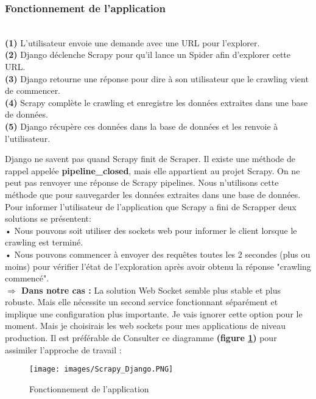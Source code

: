 \subsubsection{Fonctionnement de l'application}\\
\noindent\textbf{(1)} L'utilisateur envoie une demande avec une URL pour l'explorer. \\
\textbf{(2)} Django déclenche Scrapy pour qu'il lance un Spider afin d'explorer cette URL. \\
\textbf{(3)} Django retourne une réponse pour dire à son utilisateur que le crawling vient de commencer.\\ 
\textbf{(4)} Scrapy complète le crawling et enregistre les données extraites dans une base de données. \\
\textbf{(5)} Django récupère ces données dans la base de données et les renvoie à l'utilisateur. 
\vspace{0.5cm}

Django ne savent pas quand Scrapy finit de Scraper. Il existe une méthode de rappel appelée \textbf{pipeline\_closed}, mais elle appartient au projet Scrapy. On ne peut pas renvoyer une réponse de Scrapy pipelines. Nous n'utilisons cette méthode que pour sauvegarder les données extraites dans une base de données.\\
Pour informer l'utilisateur de l'application que Scrapy a fini de Scrapper deux solutions se présentent:\\
\indent• Nous pouvons soit utiliser des sockets web pour informer le client lorsque le crawling est terminé.\\
\indent• Nous pouvons commencer à envoyer des requêtes toutes les 2 secondes (plus ou moins) pour vérifier l'état de l'exploration après avoir obtenu la réponse "crawling commencé".\\

\textbf{$\Rightarrow$ Dans notre cas :} La solution Web Socket semble plus stable et plus robuste. Mais elle nécessite un second service fonctionnant séparément et implique une configuration plus importante. Je vais ignorer cette option pour le moment. Mais je choisirais les web sockets pour mes applications de niveau production.
Il est préférable de Consulter ce diagramme \textbf{(figure \ref{fig:fonctDjango})} pour assimiler l'approche de travail :
\begin{figure}[H]
            \centering
            \texttt{[image: images/Scrapy\_Django.PNG]}
            \caption{Fonctionnement de l'application \cite{fonction}}
            \label{fig:fonctDjango}  
        \end{figure}

